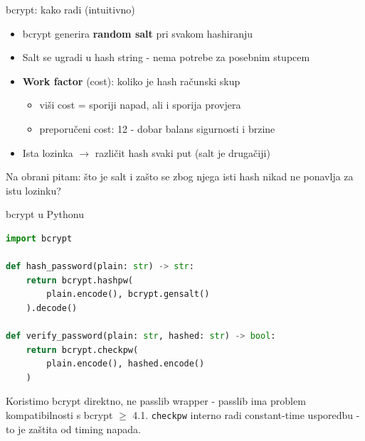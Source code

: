 \begin{frame}{bcrypt: kako radi (intuitivno)}
	\begin{itemize}
		\item bcrypt generira \textbf{random salt} pri svakom hashiranju
		\item Salt se ugradi u hash string - nema potrebe za posebnim stupcem
		\item \textbf{Work factor} (cost): koliko je hash računski skup
		\begin{itemize}
			\item viši cost = sporiji napad, ali i sporija provjera
			\item preporučeni cost: 12 - dobar balans sigurnosti i brzine
		\end{itemize}
		\item Ista lozinka $\rightarrow$ različit hash svaki put (salt je drugačiji)
	\end{itemize}

	\vspace{0.6em}
	Na obrani pitam: što je salt i zašto se zbog njega isti hash nikad ne ponavlja za istu lozinku?
\end{frame}

\begin{frame}[fragile,shrink=5]{bcrypt u Pythonu}
\begin{lstlisting}[language=python]
import bcrypt

def hash_password(plain: str) -> str:
    return bcrypt.hashpw(
        plain.encode(), bcrypt.gensalt()
    ).decode()

def verify_password(plain: str, hashed: str) -> bool:
    return bcrypt.checkpw(
        plain.encode(), hashed.encode()
    )
\end{lstlisting}

	\vspace{0.4em}
	Koristimo bcrypt direktno, ne passlib wrapper - passlib ima problem kompatibilnosti s bcrypt $\geq$ 4.1.
	\texttt{checkpw} interno radi constant-time usporedbu - to je zaštita od timing napada.
\end{frame}

